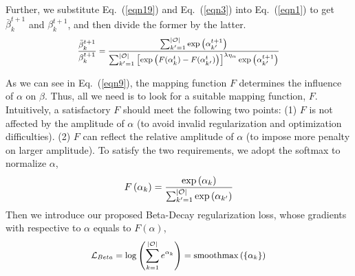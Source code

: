 \documentclass[10pt,twocolumn,letterpaper]{article}
\begin{document}
Further, we substitute Eq.~(\ref{eqn19}) and Eq.~(\ref{eqn3}) into Eq.~(\ref{eqn1}) to get $\bar{\beta}_{k}^{t+1}$ and $\beta_{k}^{t+1}$, and then divide the former by the latter.
\begin{equation} \label{eqn9}
\footnotesize
  \begin{split}
    \frac{\bar{\beta}_{k}^{t+1}}{\beta_{k}^{t+1}}=\frac{\sum_{k^{\prime}=1}^{\left | \mathcal{O}\right |} \exp \left(\alpha_{k^{\prime}}^{t+1}\right)}{\sum_{k^{\prime}=1}^{\left | \mathcal{O}\right |} \left[\exp \left(F(\alpha_{k}^{t})-F(\alpha_{k^{\prime}}^{t})\right)\right]^{\lambda \eta_{\alpha}} \exp \left(\alpha_{k^{\prime}}^{t+1}\right)}
  \end{split}
  \vspace{-6pt}
\end{equation}

As we can see in Eq.~(\ref{eqn9}), the mapping function $F$ determines the influence of $\alpha$ on $\beta$. Thus, all we need is to look for a suitable mapping function, $F$. Intuitively, a satisfactory $F$ should meet the following two points: (1) $F$ is not affected by the amplitude of $\alpha$ (to avoid invalid regularization and optimization difficulties). 
(2) $F$ can reflect the relative amplitude of $\alpha$ (to impose more penalty on larger amplitude). 
To satisfy the two requirements, we adopt the softmax to normalize $\alpha$, 
\begin{equation} \label{eqn11}
  \begin{split}
    F\left(\alpha_{k}\right)=\frac{\exp \left(\alpha_{k}\right)}{\sum_{k^{\prime}=1}^{\left | \mathcal{O}\right |} \exp \left(\alpha_{k^{\prime}}\right)}
  \end{split}
  \vspace{-6pt}
\end{equation}
Then we introduce our proposed Beta-Decay regularization loss, whose gradients with respective to $\alpha$ equals to $F\left(\alpha\right)$, 
\begin{equation} \label{eqn10}
\small
  \begin{split}
    \mathcal{L}_{Beta} = \log \left(\sum_{k=1}^{\left | \mathcal{O}\right |}  e^{\alpha_k}\right) = \operatorname{smoothmax} \left(\left\{\alpha_{k}\right\}\right) 
  \end{split}
  \vspace{-6pt}
\end{equation}
\end{document}
